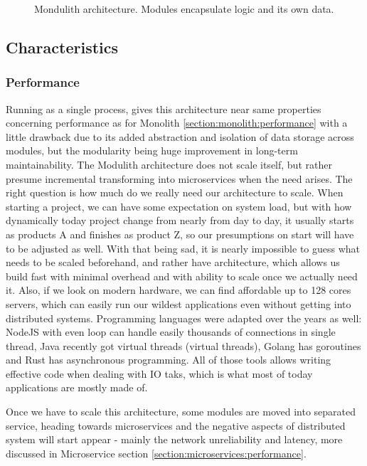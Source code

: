 \begin{figure}
    \centering
    
    \caption{Mondulith architecture. Modules encapsulate logic and its own data. \label{img:modulith_architecture}}
\end{figure}

\subsection{Characteristics}
\subsubsection{Performance}
Running as a single process, gives this architecture near same properties concerning performance as for Monolith \ref{section:monolith:performance} with a little drawback due to its added abstraction and isolation of data storage across modules, but the modularity being huge improvement in long-term maintainability. The Modulith architecture does not scale itself, but rather presume incremental transforming into microservices when the need arises. The right question is how much do we really need our architecture to scale. When starting a project, we can have some expectation on system load, but with how dynamically today project change from nearly from day to day, it usually starts as products A and finishes as product Z, so our presumptions on start will have to be adjusted as well. With that being sad, it is nearly impossible to guess what needs to be scaled beforehand, and rather have architecture, which allows us build fast with minimal overhead and with ability to scale once we actually need it. Also, if we look on modern hardware, we can find affordable up to 128 cores servers, which can easily run our wildest applications even without getting into distributed systems. Programming languages were adapted over the years as well: NodeJS with even loop can handle easily thousands of connections in single thread, Java recently got virtual threads (virtual threads), Golang has goroutines and Rust has asynchronous programming. All of those tools allows writing effective code when dealing with IO taks, which is what most of today applications are mostly made of.

Once we have to scale this architecture, some modules are moved into separated service, heading towards microservices and the negative aspects of distributed system will start appear - mainly the network unreliability and latency, more discussed in Microservice section \ref{section:microservices:performance}.


